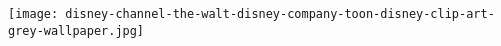 {
    \texttt{[image: disney-channel-the-walt-disney-company-toon-disney-clip-art-grey-wallpaper.jpg]}
}
